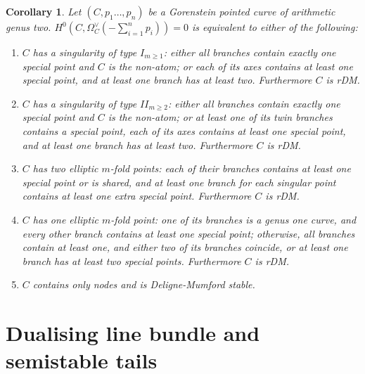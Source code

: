 \documentclass[11pt]{amsart}
\theoremstyle{plain}
\newtheorem{cor}[thm]{Corollary}
\theoremstyle{definition}
\begin{document}
\begin{cor}\label{cor:explicitnoaut}
 Let $(C,p_1\ldots,p_n)$ be a Gorenstein pointed curve of arithmetic genus two. $H^0(C,\Omega_C^\vee(-\sum_{i=1}^n p_i))=0$ is equivalent to either of the following:
 \begin{enumerate}[leftmargin=.6cm]
  \item $C$ has a singularity of type $I_{m\geq 1}$: either all branches contain exactly one special point and $C$ is the non-atom; or each of its axes contains at least one special point, and at least one branch has at least two. Furthermore $C$ is rDM.
  \item $C$ has a singularity of type $I\!I_{m\geq 2}$: either all branches contain exactly one special point and $C$ is the non-atom; or at least one of its twin branches contains a special point, each of its axes contains at least one special point, and at least one branch has at least two. Furthermore $C$ is rDM.
  \item $C$ has two elliptic $m$-fold points: each of their branches contains at least one special point or is shared, and at least one branch for each singular point contains at least one extra special point. Furthermore $C$ is rDM.
  \item $C$ has one elliptic $m$-fold point: one of its branches is a genus one curve, and every other branch contains at least one special point; otherwise, all branches contain at least one, and either two of its branches coincide, or at least one branch has at least two special points. Furthermore $C$ is rDM.
  \item $C$ contains only nodes and is Deligne-Mumford stable.
 \end{enumerate}
\end{cor}

\section{Dualising line bundle and semistable tails}\label{sec:sstails}
\end{document}
